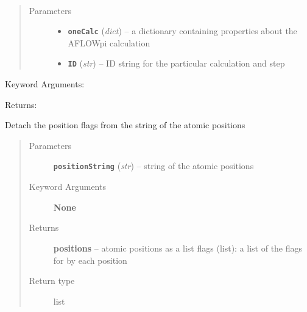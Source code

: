 \documentclass[letterpaper,10pt,english]{sphinxmanual}
\begin{document}

\begin{fulllineitems}
\label{retr:retr.convertFCC}~\begin{quote}\begin{description}
\item[{Parameters}] \leavevmode\begin{itemize}
\item {} 
\textbf{\texttt{oneCalc}} (\emph{dict}) -- a dictionary containing properties about the AFLOWpi calculation

\item {} 
\textbf{\texttt{ID}} (\emph{str}) -- ID string for the particular calculation and step

\end{itemize}

\end{description}\end{quote}

Keyword Arguments:

Returns:

\end{fulllineitems}


\begin{fulllineitems}
\label{retr:retr.detachPosFlags}
Detach the position flags from the string of the atomic positions
\begin{quote}\begin{description}
\item[{Parameters}] \leavevmode
\textbf{\texttt{positionString}} (\emph{str}) -- string of the atomic positions

\item[{Keyword Arguments}] \leavevmode
\textbf{None}

\item[{Returns}] \leavevmode
\textbf{positions} --
atomic positions as a list
flags (list): a list of the flags for by each position

\item[{Return type}] \leavevmode
list

\end{description}\end{quote}

\end{fulllineitems}
\end{document}
